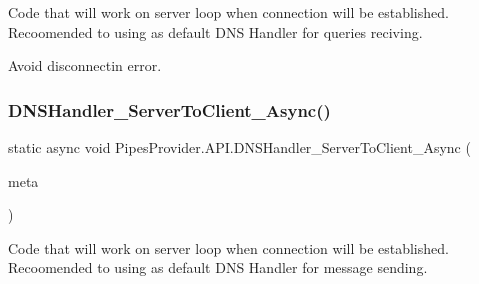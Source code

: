 Code that will work on server loop when connection will be established. Recoomended to using as default D\+NS Handler for queries reciving. 

Avoid disconnectin error. \mbox{\label{class_pipes_provider_1_1_a_p_i_af1648503e83d5ecd72af553ea5d461f5}} 
\subsubsection{\texorpdfstring{D\+N\+S\+Handler\+\_\+\+Server\+To\+Client\+\_\+\+Async()}{DNSHandler\_ServerToClient\_Async()}}
{\footnotesize\ttfamily static async void Pipes\+Provider.\+A\+P\+I.\+D\+N\+S\+Handler\+\_\+\+Server\+To\+Client\+\_\+\+Async (\begin{DoxyParamCaption}\item[{\mbox{\hyperlink{class_pipes_provider_1_1_server_transmission_meta}{Pipes\+Provider.\+Server\+Transmission\+Meta}}}]{meta }\end{DoxyParamCaption})\hspace{0.3cm}{\ttfamily [static]}}



Code that will work on server loop when connection will be established. Recoomended to using as default D\+NS Handler for message sending. 

\mbox{\label{class_pipes_provider_1_1_a_p_i_ab18891bb1d9c04a9c9144e0d8c89aebf}} 
